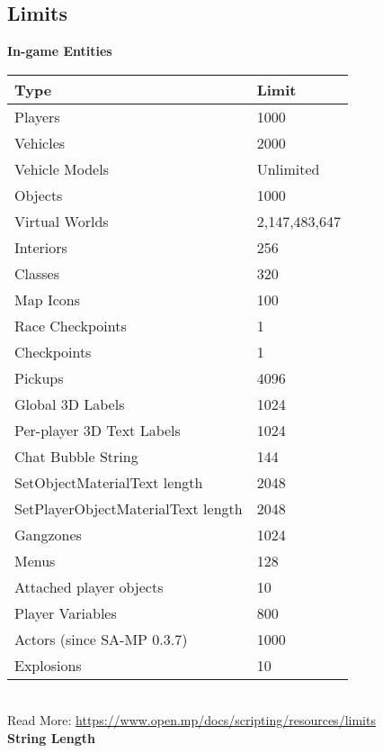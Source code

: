 \documentclass{article}
\begin{document}
\subsection{Limits}
\textbf{In-game Entities}
\bigskip
\\\begin{tabular}{ |l|l| } 
\hline
Type & Limit \\
\hline
Players & 1000 \\
Vehicles & 2000 \\
Vehicle Models & Unlimited \\
Objects & 1000 \\
Virtual Worlds & 2,147,483,647 \\
Interiors & 256 \\
Classes & 320 \\
Map Icons & 100 \\
Race Checkpoints & 1 \\
Checkpoints & 1 \\
Pickups & 4096 \\
Global 3D Labels & 1024 \\
Per-player 3D Text Labels & 1024 \\
Chat Bubble String & 144 \\
SetObjectMaterialText length & 2048 \\
SetPlayerObjectMaterialText length & 2048 \\
Gangzones & 1024 \\
Menus & 128 \\
Attached player objects & 10 \\
Player Variables & 800 \\
Actors (since SA-MP 0.3.7) & 1000 \\
Explosions & 10 \\
\hline
\end{tabular}
\bigskip
\\Read More: \url{https://www.open.mp/docs/scripting/resources/limits}
\bigskip
\\\textbf{String Length}
\bigskip
\end{document}
